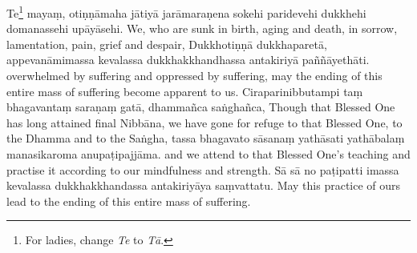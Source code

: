 \chantgap
\begin{chantsubsection}
  \chantlineinline
    {Te\footnote{For ladies, change \emph{Te} to \emph{Tā}.} mayaṃ, otiṇṇāmaha
     jātiyā jarāmaraṇena sokehi paridevehi dukkhehi domanassehi upāyāsehi.}
    {We, who are sunk in birth, aging and death, in sorrow, lamentation, pain,
     grief and despair,}
  \chantlineinline
    {Dukkhotiṇṇā dukkhaparetā, appevanāmimassa kevalassa
     dukkhakkhandhassa antakiriyā paññāyethāti.}
    {overwhelmed by suffering and oppressed by suffering, may the ending of this
     entire mass of suffering become apparent to us.}
  \chantlineinline
    {Ciraparinibbutampi taṃ bhagavantaṃ saraṇaṃ gatā,
     dhammañca saṅghañca,}
    {Though that Blessed One has long attained final Nibbāna, we have gone for
     refuge to that Blessed One, to the Dhamma and to the Saṅgha,}
  \chantlineinline
    {tassa bhagavato sāsanaṃ yathāsati yathābalaṃ manasikaroma
     anupaṭipajjāma.}
    {and we attend to that Blessed One’s teaching and practise it according to
     our mindfulness and strength.}
  \chantlineinline
    {Sā sā no paṭipatti imassa kevalassa dukkhakkhandassa
     antakiriyāya saṃvattatu.}
    {May this practice of ours lead to the ending of this entire mass of suffering.}
\end{chantsubsection}
